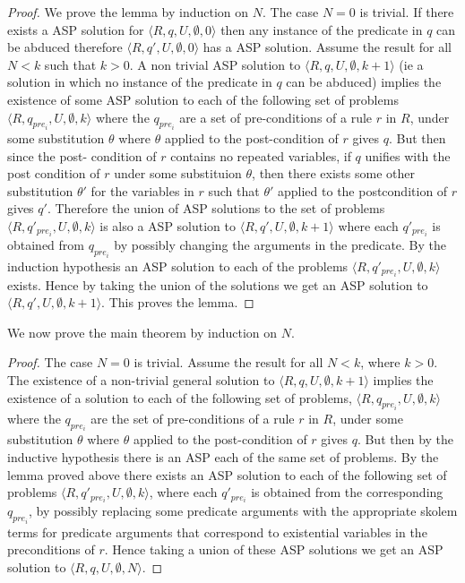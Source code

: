 \begin{proof}
We prove the lemma by induction on $N$.
The case $N = 0$ is trivial. If there exists a ASP solution for $\langle
R,q,U,\emptyset,0\rangle$ then any instance of the predicate in $q$ can be
abduced therefore $\langle R,q',U,\emptyset,0\rangle$ has a ASP solution. Assume
the result for all $N<k$ such that $k>0$. A non trivial ASP solution to
$\langle R,q,U,\emptyset,k+1\rangle$ (ie a solution in which no instance of the predicate in $q$ can be abduced) implies the existence of some ASP solution to
each of the following set of problems $\langle R,q_{pre_{i}},U,\emptyset,k\rangle$
where the $q_{pre_{i}}$ are a set of
pre-conditions of a rule $r$ in $R$, under some substitution $\theta$ where
$\theta$ applied to the post-condition of $r$ gives $q$. But then since the post- condition of $r$
contains no repeated variables, if $q$ unifies with the post condition of $r$
under some substituion $\theta$, then there exists some other substitution
$\theta'$ for the variables in $r$ such that $\theta'$ applied to the
postcondition of $r$ gives $q'$. Therefore the union of ASP solutions to the set of problems
$\langle R,q'_{pre_{i}},U,\emptyset,k\rangle$ is also a ASP solution to $\langle
R,q',U,\emptyset,k+1\rangle$ where each $q'_{pre_{i}}$ is obtained from
$q_{pre_{i}}$ by possibly changing the arguments in the predicate. By the
induction hypothesis an ASP solution to each of the problems $\langle
R,q'_{pre_{i}},U,\emptyset,k\rangle$ exists. Hence by taking the union of the solutions we get an ASP solution to  $\langle
R,q',U,\emptyset,k+1\rangle$. This proves the lemma.
\end{proof}

We now prove the main theorem by induction on $N$. 

\begin{proof}
The case $N=0$ is trivial. Assume
the result for all $N<k$, where $k>0$. The existence of a non-trivial general solution
to $\langle R,q,U,\emptyset,k+1\rangle$ implies the existence of a solution to each of the following set of problems, $\langle R,q_{pre_{i}},U,\emptyset,k\rangle$ where the $q_{pre_{i}}$ are the set of
pre-conditions of a rule $r$ in $R$, under some substitution $\theta$ where
$\theta$ applied to the post-condition of $r$ gives $q$. But then by the
inductive hypothesis there is an ASP each of the same set of problems. By
the lemma proved above there exists an ASP solution to each of the following set of
problems $\langle R,q'_{pre_{i}},U,\emptyset,k\rangle$, where each
$q'_{pre_{i}}$ is obtained from the corresponding $q_{pre_{i}}$, by possibly
replacing some predicate arguments with the appropriate skolem terms for
predicate arguments that correspond to existential variables in the
preconditions of $r$. Hence taking a union of these ASP solutions we get an ASP solution to
$\langle R,q,U,\emptyset,N\rangle$.
\end{proof}



